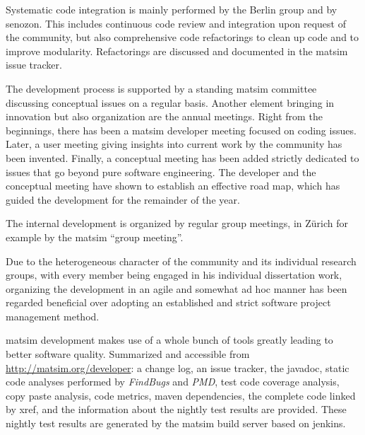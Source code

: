 Systematic code integration is mainly performed by the Berlin group and by \gls{senozon}. 
This includes continuous code review and integration upon request of the community, but also comprehensive code refactorings to clean up
code and to 
improve modularity.  Refactorings are discussed and documented in the \gls{matsim} issue tracker.

The development process is supported by a standing \gls{matsim} committee discussing conceptual issues on a regular basis. 
Another element bringing in innovation but also organization are the annual meetings. 
Right from the beginnings, there has been a \gls{matsim} developer meeting focused on coding issues. 
Later, a user meeting giving insights into current work by the community has been invented. 
Finally, a conceptual meeting has been added strictly dedicated to issues that go beyond pure software engineering. 
The developer and the conceptual meeting have shown to establish an effective road map, which has guided the development for the remainder of the year. 

The internal development is organized by regular group meetings, in Zürich for example by the \gls{matsim} ``group meeting''.

Due to the heterogeneous character of the community and its individual research groups, with every member being engaged in his individual dissertation work, organizing the development in an agile and somewhat ad hoc manner has been regarded beneficial over adopting an established and strict software project management method.


\gls{matsim} development makes use of a whole bunch of tools greatly leading to better software quality. Summarized and accessible from \url{http://matsim.org/developer}:
%
a change log, an issue tracker, the \gls{javadoc}, static code analyses performed by \emph{FindBugs} and \emph{PMD}, test code coverage analysis, copy paste analysis, code metrics, \gls{maven} dependencies, the complete code linked by \gls{xref}, and the information about the nightly test results are provided. These nightly test results are generated by the \gls{matsim} build server based on \gls{jenkins}. 

